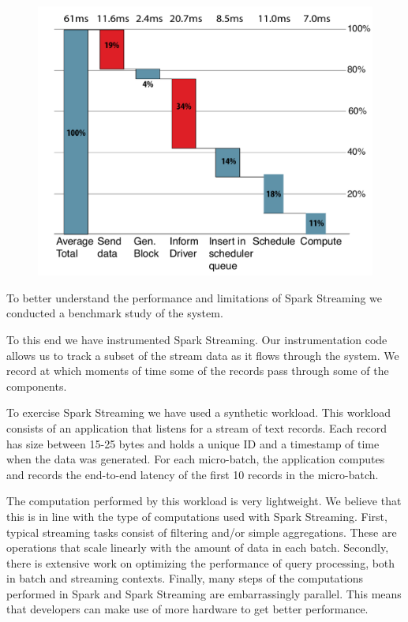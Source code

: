 \begin{figure}[t!]
  \begin{center}
    \includegraphics[scale=0.40]{images_graphs/waterfall/Rplots_illustrator.pdf}
  \end{center}
  \caption{}
  \label{fig:SparkStreaming_time_breakdown}
\end{figure}

To better understand the performance and limitations of Spark Streaming we conducted a benchmark study of the system.

To this end we have instrumented Spark Streaming.
Our instrumentation code allows us to track a subset of the stream data as it flows through the system.
We record at which moments of time some of the records pass through some of the components.

To exercise Spark Streaming we have used a synthetic workload.
This workload consists of an application that listens for a stream of text records.
Each record has size between 15-25 bytes and holds a unique ID and a timestamp of time when the data was generated.
For each micro-batch, the application computes and records the end-to-end latency of the first 10 records in the micro-batch.

The computation performed by this workload is very lightweight.
We believe that this is in line with the type of computations used with Spark Streaming.
First, typical streaming tasks consist of filtering and/or simple aggregations.
These are operations that scale linearly with the amount of data in each batch.
Secondly, there is extensive work on optimizing the performance of query processing, both in batch and streaming contexts.
Finally, many steps of the computations performed in Spark and Spark Streaming are embarrassingly parallel. 
This means that developers can make use of more hardware to get better performance. 

